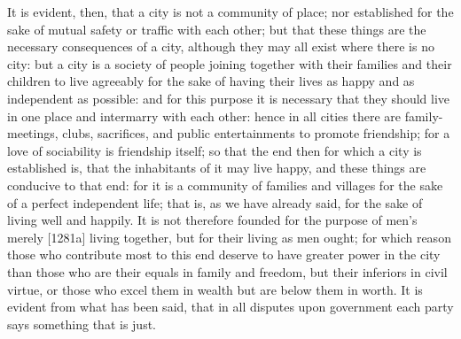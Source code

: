 It is evident, then, that a city is not a community of place; nor
established for the sake of mutual safety or traffic with each other; but
that these things are the necessary consequences of a city, although they
may all exist where there is no city: but a city is a society of people
joining together with their families and their children to live agreeably
for the sake of having their lives as happy and as independent as
possible: and for this purpose it is necessary that they should live in
one place and intermarry with each other: hence in all cities there are
family-meetings, clubs, sacrifices, and public entertainments to promote
friendship; for a love of sociability is friendship itself; so that the
end then for which a city is established is, that the inhabitants of it
may live happy, and these things are conducive to that end: for it is a
community of families and villages for the sake of a perfect independent
life; that is, as we have already said, for the sake of living well and
happily. It is not therefore founded for the purpose of men's merely
[1281a] living together, but for their living as men ought; for which
reason those who contribute most to this end deserve to have greater power
in the city than those who are their equals in family and freedom, but
their inferiors in civil virtue, or those who excel them in wealth but are
below them in worth. It is evident from what has been said, that in all
disputes upon government each party says something that is just.


